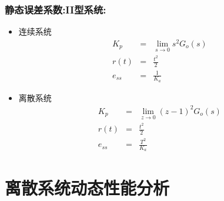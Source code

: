 \documentclass[table]{beamer}
\begin{document}
\begin{frame}
\frametitle{静态误差系数:II型系统:}
\label{sec-6-2-4}
\begin{itemize}

\item 连续系统
\label{sec-6-2-4-1}%
\begin{eqnarray*}
K_p &=& \lim_{s\rightarrow 0}s^2G_o(s)  \\
r(t)&=& \frac{t^2}{2} \\
e_{ss} &=& \frac{1}{K_a} 
\end{eqnarray*}

\item 离散系统
\label{sec-6-2-4-2}%
\begin{eqnarray*}
K_p &=& \lim_{z\rightarrow 0}(z-1)^2G_o(s)  \\
r(t)&=& \frac{t^2}{2} \\
e_{ss} &=& \frac{T^2}{K_a} 
\end{eqnarray*}

\end{itemize} %
\end{frame}
\section{离散系统动态性能分析}
\label{sec-7}







\end{document}
